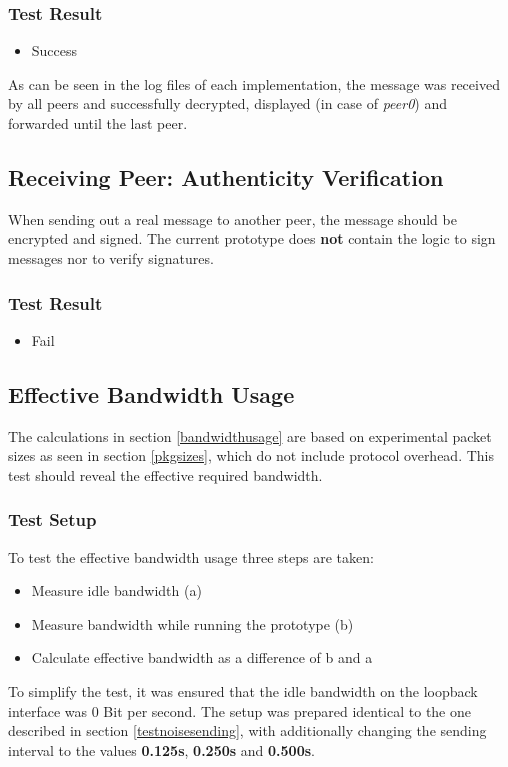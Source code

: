 \subsubsection{Test Result}
\begin{itemize}
\item Success
\end{itemize}
As can be seen in the log files of each implementation,
the message was received by all peers and successfully decrypted,
displayed (in case of \textit{peer0}) and forwarded until the last
peer.
\subsection{Receiving Peer: Authenticity Verification}
When sending out a real message to another peer, the message should be
encrypted and signed. 
The current prototype does \textbf{not} contain
the logic to sign messages nor to verify signatures.
\subsubsection{Test Result}
\begin{itemize}
\item Fail
\end{itemize}
\subsection{Effective Bandwidth Usage}
The calculations in section \ref{bandwidthusage} are based on experimental
packet sizes as seen in section \ref{pkgsizes}, which do not include
protocol overhead. This test should reveal the effective required
bandwidth.
\subsubsection{Test Setup}
To test the effective bandwidth usage three steps are taken:
\begin{itemize}
\item Measure idle bandwidth (a)
\item Measure bandwidth while running the prototype (b)
\item Calculate effective bandwidth as a difference of b and a
\end{itemize}
To simplify the test, it was ensured that the idle bandwidth on the
loopback interface was 0 Bit per second.
The setup was prepared identical to the one described
in section \ref{testnoisesending}, with additionally changing
the sending interval to the values \textbf{0.125s},
\textbf{0.250s} and \textbf{0.500s}.
